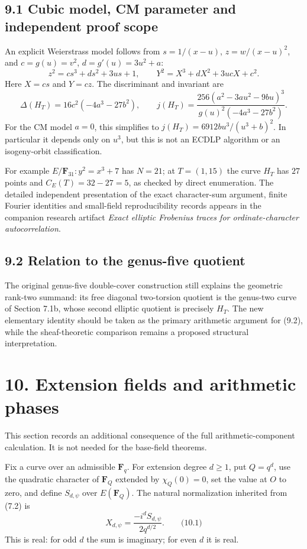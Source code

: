 \documentclass[
  11pt,
  a4paper,
]{article}
\begin{document}
\subsection{9.1 Cubic model, CM parameter and independent proof scope}
An explicit Weierstrass model follows from
\(s=1/(x-u)\), \(z=w/(x-u)^2\), and
\(c=g(u)=v^2\), \(d=g'(u)=3u^2+a\):
\[
 z^2=cs^3+ds^2+3us+1,
\qquad
 Y^2=X^3+dX^2+3ucX+c^2.
\tag{9.6}
\]
Here \(X=cs\) and \(Y=cz\). The discriminant and invariant are
\[
\Delta(H_T)=16c^2(-4a^3-27b^2),\qquad
j(H_T)=\frac{256(a^2-3au^2-9bu)^3}
{g(u)^2(-4a^3-27b^2)}.
\tag{9.7}
\]
For the CM model \(a=0\), this simplifies to
\(j(H_T)=6912bu^3/(u^3+b)^2\). In particular it depends
only on \(u^3\), but this is not an ECDLP algorithm or an
isogeny-orbit classification.

For example \(E/\mathbf F_{31}:y^2=x^3+7\) has \(N=21\);
at \(T=(1,15)\) the curve \(H_T\) has \(27\) points and
\(C_E(T)=32-27=5\), as checked by direct enumeration.
The detailed independent presentation of the exact character-sum
argument, finite Fourier identities and small-field reproducibility
records appears in the companion research artifact
\emph{Exact elliptic Frobenius traces for ordinate-character autocorrelation}.

\subsection{9.2 Relation to the genus-five quotient}
The original genus-five double-cover construction still explains the
geometric rank-two summand: its free diagonal two-torsion quotient is
the genus-two curve of Section 7.1b, whose second elliptic quotient
is precisely \(H_T\). The new elementary identity should be taken as
the primary arithmetic argument for (9.2), while the sheaf-theoretic
comparison remains a proposed structural interpretation.

\section{10. Extension fields and arithmetic
phases}\label{extension-fields-and-arithmetic-phases}

This section records an additional consequence of the full
arithmetic-component calculation. It is not needed for the base-field
theorems.

Fix a curve over an admissible \(\mathbf F_q\). For extension degree
\(d\ge1\), put \(Q=q^d\), use the quadratic character of \(\mathbf F_Q\)
extended by \(\chi_Q(0)=0\), set the value at \(O\) to zero, and define
\(S_{d,\psi}\) over \(E(\mathbf F_Q)\). The natural normalization
inherited from (7.2) is \[
X_{d,\psi}=\frac{-i^d S_{d,\psi}}{2q^{d/2}}.
\qquad \text{(10.1)}
\] This is real: for odd \(d\) the sum is imaginary; for even \(d\) it
is real.
\end{document}
